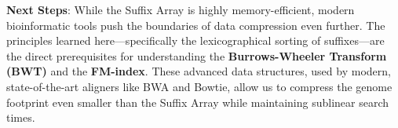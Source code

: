 \sta \textbf{Next Steps}: While the Suffix Array is highly memory-efficient, modern bioinformatic tools push the boundaries of data compression even further. The principles learned here—specifically the lexicographical sorting of suffixes—are the direct prerequisites for understanding the \textbf{Burrows-Wheeler Transform (BWT)} and the \textbf{FM-index}. These advanced data structures, used by modern, state-of-the-art aligners like BWA and Bowtie, allow us to compress the genome footprint even smaller than the Suffix Array while maintaining sublinear search times.

